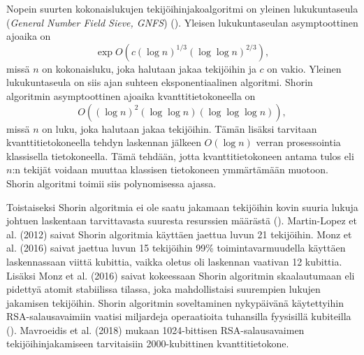 Nopein suurten kokonaislukujen tekijöihinjakoalgoritmi on yleinen lukukuntaseula (\emph{General Number Field Sieve, GNFS}) (\cite{doi:10.1137/S0036144598347011}). Yleisen lukukuntaseulan asymptoottinen ajoaika on \[\exp  O(c(\log n)^{1/3} (\log \log n)^{2/3}),\] missä $n$ on kokonaisluku, joka halutaan jakaa tekijöihin ja $c$ on vakio. Yleinen lukukuntaseula on siis ajan suhteen eksponentiaalinen algoritmi. Shorin algoritmin asymptoottinen ajoaika kvanttitietokoneella on \[O((\log n)^{2}(\log \log n) (\log \log \log n)),\] missä $n$ on luku, joka halutaan jakaa tekijöihin. Tämän lisäksi tarvitaan kvanttitietokoneella tehdyn laskennan jälkeen $O(\log n)$ verran prosessointia klassisella tietokoneella. Tämä tehdään, jotta kvanttitietokoneen antama tulos eli $n$:n tekijät voidaan muuttaa klassisen tietokoneen ymmärtämään muotoon. Shorin algoritmi toimii siis polynomisessa ajassa.

Toistaiseksi Shorin algoritmia ei ole saatu jakamaan tekijöihin kovin suuria lukuja johtuen laskentaan tarvittavasta suuresta resurssien määrästä (\cite{martin2012experimental}). Martin-Lopez et al. (2012) saivat Shorin algoritmia käyttäen jaettua luvun 21 tekijöihin. Monz et al. (2016) saivat jaettua luvun 15 tekijöihin 99\% toimintavarmuudella käyttäen laskennassaan viittä kubittia, vaikka oletus oli laskennan vaativan 12 kubittia. Lisäksi Monz et al. (2016) saivat kokeessaan Shorin algoritmin skaalautumaan eli pidettyä atomit stabiilissa tilassa, joka mahdollistaisi suurempien lukujen jakamisen tekijöihin. Shorin algoritmin soveltaminen nykypäivänä käytettyihin RSA-salausavaimiin vaatisi miljardeja operaatioita tuhansilla fyysisillä kubiteilla (\cite{bernstein2017post}). Mavroeidis et al. (2018) mukaan 1024-bittisen RSA-salausavaimen tekijöihinjakamiseen tarvitaisiin 2000-kubittinen kvanttitietokone.